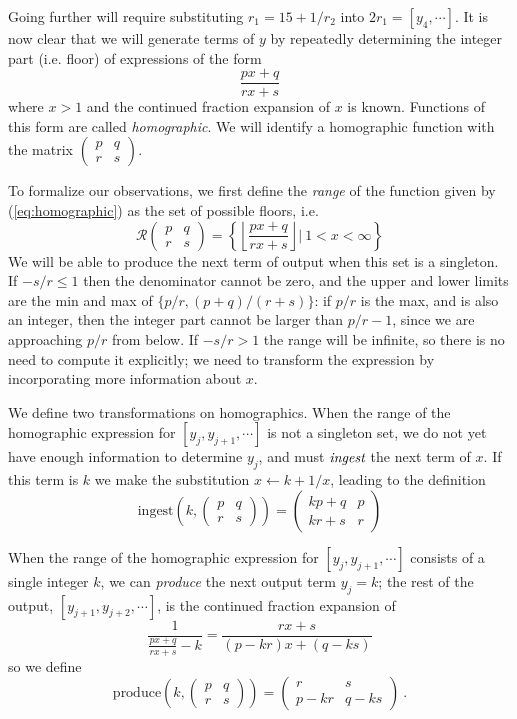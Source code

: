 \documentclass[11pt, oneside]{amsart}   	%
\newcommand{\pqrs}{\left(
\begin{smallmatrix} 
p & q\\ 
r & s 
\end{smallmatrix}
\right)}
\newcommand{\homographic}[4]{\begin{pmatrix} #1 & #2\\ #3 & #4 \end{pmatrix}}
\begin{document}
Going further will require substituting $r_1 = 15+1/r_2$ into $2r_1 = [y_4,\cdots]$.
It is now clear that we will generate terms of $y$ by repeatedly determining the integer part (i.e. floor) of expressions of the form
\begin{equation}\label{eq:homographic}
\frac{px+q}{rx+s}
\end{equation}
where $x>1$ and the continued fraction expansion of $x$ is known. Functions of this form are called \emph{homographic}.
We will identify a homographic function with the matrix
$\left(
\begin{smallmatrix} 
p & q\\ 
r & s 
\end{smallmatrix}
\right)$.

To formalize our observations, we first define the \emph{range} of the function given by (\ref{eq:homographic}) as the set of possible floors, i.e.
\begin{equation}
\mathcal{R}\pqrs = \left\{ \left\lfloor \frac{px+q}{rx+s} \right\rfloor | \  1 < x < \infty \right\}
\end{equation}
We will be able to produce the next term of output when this set is a singleton. If $-s/r \leq 1$ then the denominator cannot be zero, and the upper and lower limits are the min and max of $\{p/r, (p+q)/(r+s)\}$: if $p/r$ is the max, and is also an integer, then the integer part cannot be larger than $p/r-1$, since we are approaching $p/r$ from below. If  $-s/r > 1$ the range will be infinite, so there is no need to compute it explicitly; we need to transform the expression by incorporating more information about $x$.

We define two transformations on homographics. When the range of the homographic expression for $[y_j,y_{j+1},\cdots]$ is not a singleton set, we do not yet have enough information to determine $y_j$, and must $\emph{ingest}$ the next term of $x$. If this term is $k$ we make the substitution $x \leftarrow k + 1/x$, leading to the definition
\begin{equation}
\mbox{ingest}(k,\pqrs) = \homographic{kp+q}{p}{kr+s}{r}%
\end{equation}


When the range of the homographic expression for $[y_j,y_{j+1},\cdots]$ consists of a single integer $k$, we can \emph{produce}  the next output term $y_j = k$; the rest of the output, $[y_{j+1},y_{j+2},\cdots]$, is the continued fraction expansion of
\[
\frac{1}{\frac{px+q}{rx+s}-k} = \frac{rx+s}{(p-kr)x + (q-ks)}
\] 
so we define 
\begin{equation}
\mbox{produce}(k,\pqrs) = \homographic{r}{s}{p-kr}{q-ks}\ .
\end{equation}
\end{document}
